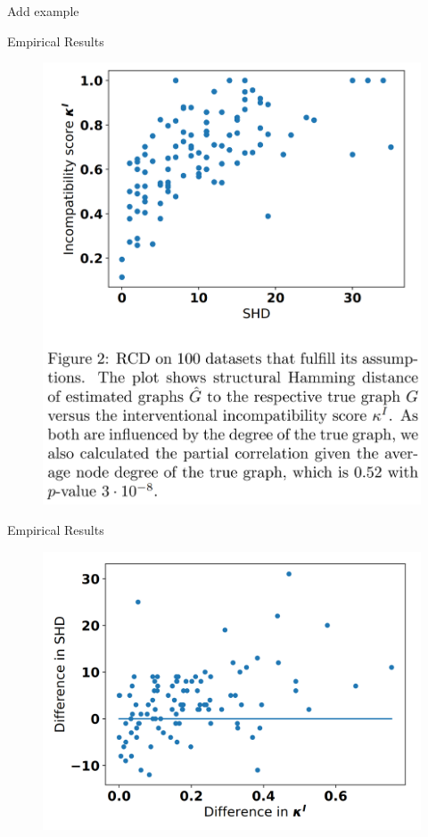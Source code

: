 \documentclass{beamer}
\begin{document}
\begin{frame}
	Add example
\end{frame}


\begin{frame}{Empirical Results}
	\begin{figure}
		\includegraphics[scale=0.12]{imgs/empirical1.png}
	\end{figure}
\end{frame}

\begin{frame}{Empirical Results}
	\begin{figure}
		\includegraphics[scale=0.12]{imgs/empirical2.png}
	\end{figure}
\end{frame}
\end{document}
